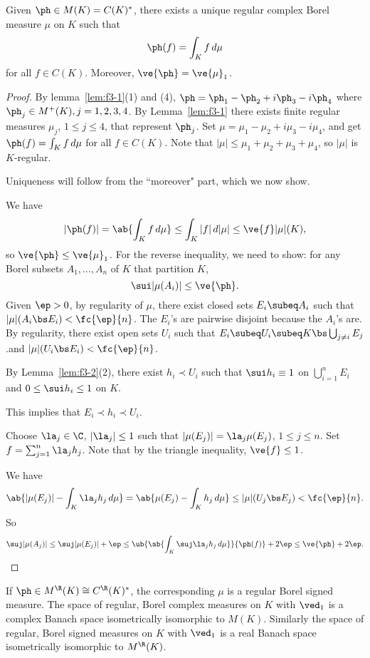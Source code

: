 \begin{cor}
Given $\ph\in M(K)=C(K)^*$, there exists a unique regular complex Borel measure $\mu$ on $K$ such that 
\[
\ph(f)=\int_K f\,d\mu
\]
for all $f\in C(K)$. Moreover, $\ve{\ph}=\ve{\mu}_1$. 
\end{cor}
\begin{proof}
By lemma~\ref{lem:f3-1}(1) and (4), $\ph=\ph_1-\ph_2+i\ph_3-i\ph_4$ where $\ph_j\in M^+(K),j=1,2,3,4$. By Lemma~\ref{lem:f3-1} there exists finite regular measures $\mu_j$, $1\le j\le 4$, that represent $\ph_j$. Set $\mu=\mu_1-\mu_2+i\mu_3-i\mu_4$, and get $\ph(f)=\int_K f\,d\mu$ for all $f\in C(K)$. 
Note that $|\mu|\le\mu_1+\mu_2+\mu_3+\mu_4$, so $|\mu|$ is $K$-regular.  

Uniqueness will follow from the ``moreover" part, which we now show.

We have 
\[
|\ph(f)|=\ab{\int_K f\,d\mu} \le \int_K |f|\,d|\mu|\le \ve{f}|\mu|(K),
\]
so $\ve{\ph}\le \ve{\mu}_1$. For the reverse inequality, we need to show: for any Borel subsets $A_1,\ldots, A_n$ of $K$ that partition $K$,
\[
\sui |\mu(A_i)|\le \ve{\ph}.
\]
Given $\ep>0$, by regularity of $\mu$, there exist closed sets $E_i\subeq A_i$ such that $|\mu|(A_i\bs E_i)<\fc{\ep}{n}$. The $E_i$'s are pairwise disjoint because the $A_i$'s are. By regularity, there exist open sets $U_i$ such that $E_i\subeq U_i\subeq K\bs \bigcup_{j\ne i}{E_j}$.and $|\mu|(U_i\bs E_i)<\fc{\ep}{n}$. 

By Lemma~\ref{lem:f3-2}(2), there exist $h_i\prec U_i$ such that $\sui h_i\equiv 1$ on $\bigcup_{i=1}^n E_i$ and $0\le \sui h_i \le 1$ on $K$. 


This implies that $E_i\prec h_i\prec U_i$. 

Choose $\la_j\in \C$, $|\la_j|\le 1$ such that $|\mu(E_j)|=\la_j\mu(E_j)$, $1\le j\le n$. Set $f=\sum_{j=1}^{n} \la_jh_j$. Note that by the triangle inequality, $\ve{f}\le 1$. 

We have
\[
\ab{
|\mu(E_j)|-\int_K\la_jh_j \,d\mu
} = 
\ab{
\mu(E_j)-\int_K h_j\,d\mu
}\le |\mu|(U_j\bs E_j)<\fc{\ep}{n}.
\]
So 
\[
\suj |\mu(A_j)|\le \suj |\mu(E_j)| +\ep
\le \ub{\ab{
\int_K \suj \la_j h_j\,d\mu
}}{\ph(f)}+2\ep
\le \ve{\ph}+2\ep.
\]
\end{proof}
\begin{rem}
If $\ph\in M^{\R}(K)\cong C^{\R}(K)^*$, the corresponding $\mu$ is a regular Borel signed measure. The space of regular, Borel complex measures on $K$ with $\ved_1$ is a complex Banach space isometrically isomorphic to $M(K)$. 
Similarly the space of regular, Borel signed measures on $K$ with $\ved_1$ is a real Banach space isometrically isomorphic to $M^{\R}(K)$. 
\end{rem}